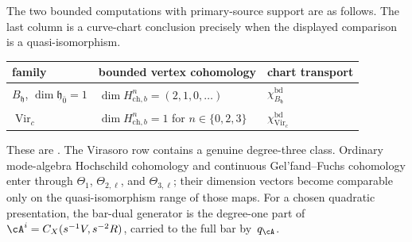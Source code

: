 \begin{remark}
\label{rem:three-hochschild-low-degree-tables}
The two bounded computations with primary-source support are as
follows.  The last column is a curve-chart conclusion precisely when
the displayed comparison is a quasi-isomorphism.
\begin{center}
\renewcommand{\arraystretch}{1.15}
\begin{tabular}{lll}
\toprule
family & bounded vertex cohomology & chart transport \\
\midrule
$B_{\mathfrak h}$, $\dim\mathfrak h_{\bar0}=1$ &
$\dim H^n_{\mathrm{ch},b}=(2,1,0,\ldots)$ &
$\chi_{B_{\mathfrak h}}^{\mathrm{bd}}$ \\
$\operatorname{Vir}_c$ &
$\dim H^n_{\mathrm{ch},b}=1$ for $n\in\{0,2,3\}$ &
$\chi_{\operatorname{Vir}_c}^{\mathrm{bd}}$ \\
\bottomrule
\end{tabular}
\end{center}
These are \cite[Theorems~7.4 and~7.2]{BDSK21}.  The Virasoro row
contains a genuine degree-three class.  Ordinary mode-algebra
Hochschild cohomology and continuous Gel'fand--Fuchs cohomology enter
through $\Theta_1$, $\Theta_{2,\ell}$, and $\Theta_{3,\ell}$; their
dimension vectors become comparable only on the quasi-isomorphism
range of those maps.  For a chosen quadratic presentation, the
bar-dual generator is the degree-one part of
$\cA^i=C_X(s^{-1}V,s^{-2}R)$, carried to the full bar by~$q_\cA$.
\end{remark}

